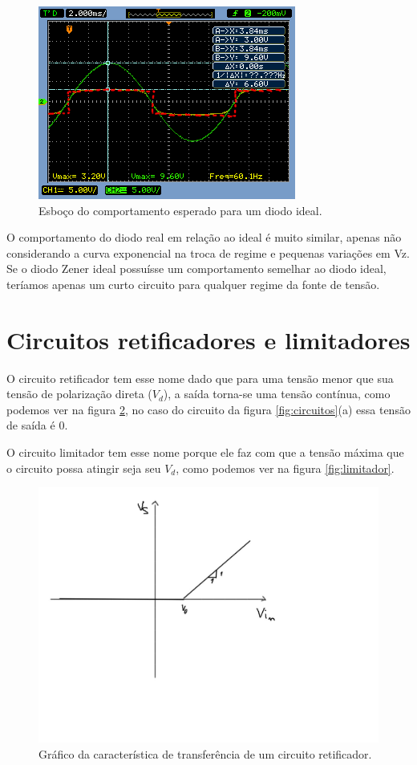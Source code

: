 \documentclass{abntex2}
\begin{document}
\begin{figure}[h]
  \centering
  \includegraphics[scale = .7]{circuito-1d-esboco.png}
  \caption{Esboço do comportamento esperado para um diodo ideal.}
  \label{fig:comp4}
\end{figure}

O comportamento do diodo real em relação ao ideal é muito similar, apenas não considerando a curva exponencial na troca de regime e pequenas variações em Vz.
Se o diodo Zener ideal possuísse um comportamento semelhar ao diodo ideal, teríamos apenas um curto circuito para qualquer regime da fonte de tensão.

\section{Circuitos retificadores e limitadores}

O circuito retificador tem esse nome dado que para uma tensão menor que sua tensão de polarização direta ($V_d$), a saída torna-se uma tensão contínua, como podemos ver na figura \ref{fig:retificador}, no caso do circuito da figura \ref{fig:circuitos}(a) essa tensão de saída é 0.

O circuito limitador tem esse nome porque ele faz com que a tensão máxima que o circuito possa atingir seja seu $V_d$, como podemos ver na figura \ref{fig:limitador}.

\begin{figure}[h]
  \centering
  \includegraphics[width=.8\textwidth]{grafRetificador.jpeg}
  \caption{Gráfico da característica de transferência de um circuito retificador.}
  \label{fig:retificador}
\end{figure}
\end{document}
